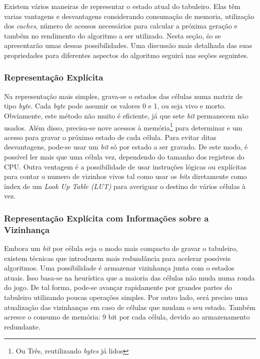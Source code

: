 Existem vários maneiras de representar o estado atual do tabuleiro. Elas têm varias vantagens e desvantagens considerando consumação de memoria, utilização dos \textit{caches}, número de acessos necessários para calcular a próxima geração e também no rendimento do algoritmo a ser utilizado. Nesta seção, śo se apresentarão umas dessas possibilidades. Uma discussão mais detalhada das suas propriedades para diferentes aspectos do algoritmo seguirá nas seções seguintes.\\

\subsubsection{Representação Explícita}
Na representação mais simples, grava-se o estados das células numa matriz de tipo \textit{byte}. Cada \textit{byte} pode assumir os valores 0 e 1, ou seja vivo e morto. Obviamente, este método não muito é eficiente, já que sete \textit{bit} permanecem não usados. Além disso, precisa-se nove acessos à memória\footnote{Ou Três, reutilizando \textit{bytes} já lidos} para determinar e um acesso para gravar o próximo estado de cada célula. Para evitar ditas desvantagens, pode-se usar um \textit{bit} só por estado a ser gravado. De este modo, é possível ler mais que uma célula vez, dependendo do tamanho dos registros do CPU. Outra ventagem é a possibilidade de usar instruções lógicas ou explícitas para contar o numero de vizinhos vivos tal como usar os \textit{bits} diretamente como índex de um \textit{Look Up Table (LUT)} para averiguar o destino de vários células à vez.\\

\subsubsection{Representação Explícita com Informações sobre a Vizinhança}
Embora um \textit{bit} por célula seja o modo mais compacto de gravar o tabuleiro, existem técnicas que introduzem mais redundância para acelerar possíveis algoritmos. Uma possibilidade é armazenar vizinhança junta com o estados atuais. Isso basa-se na heurística que a maioria das células não muda numa ronda do jogo. De tal forma, pode-se avançar rapidamente por grandes partes do tabuleiro utilizando poucas operações simples. Por outro lado, será preciso uma atualização das vizinhanças em caso de células que mudam o seu estado. Também acresce o consumo de memória: 9 bit por cada célula, devido ao armazenamento redundante.\\


